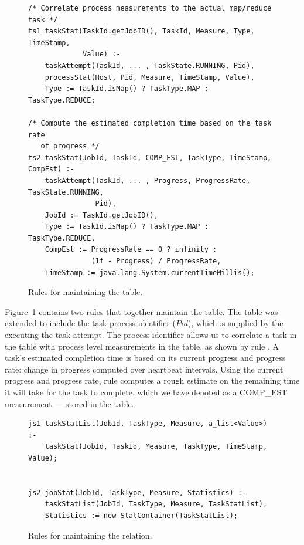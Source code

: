 \begin{figure}
\ssp
\centering
\begin{lstlisting}
/* Correlate process measurements to the actual map/reduce task */
ts1 taskStat(TaskId.getJobID(), TaskId, Measure, Type, TimeStamp, 
             Value) :-
    taskAttempt(TaskId, ... , TaskState.RUNNING, Pid),
    processStat(Host, Pid, Measure, TimeStamp, Value),
    Type := TaskId.isMap() ? TaskType.MAP : TaskType.REDUCE;
        
/* Compute the estimated completion time based on the task rate 
   of progress */
ts2 taskStat(JobId, TaskId, COMP_EST, TaskType, TimeStamp, CompEst) :-
    taskAttempt(TaskId, ... , Progress, ProgressRate, TaskState.RUNNING, 
                Pid),
    JobId := TaskId.getJobID(),
    Type := TaskId.isMap() ? TaskType.MAP : TaskType.REDUCE,
    CompEst := ProgressRate == 0 ? infinity : 
               (1f - Progress) / ProgressRate,
    TimeStamp := java.lang.System.currentTimeMillis();
\end{lstlisting}
\caption{\label{ch:hop:fig:taskstat} Rules for maintaining the  table.}
\end{figure}

Figure~\ref{ch:hop:fig:taskstat} contains two rules that together maintain the
 table.  The  table was extended to include the
task process identifier ($Pid$), which is supplied by the \TT executing the
task attempt.  The process identifier allows us to correlate a task in the
 table with process level measurements in the 
table, as shown by rule .  A task's estimated completion time is based
on its current progress and progress rate: change in progress computed over \TT
heartbeat intervals.  Using the current progress and progress rate, rule
 computes a rough estimate on the remaining time it will take for the
task to complete, which we have denoted as a COMP\_EST measurement --- stored
in the  table.

\begin{figure}
\ssp
\centering
\begin{lstlisting}
js1 taskStatList(JobId, TaskType, Measure, a_list<Value>) :-
    taskStat(JobId, TaskId, Measure, TaskType, TimeStamp, Value);

        
js2 jobStat(JobId, TaskType, Measure, Statistics) :-
    taskStatList(JobId, TaskType, Measure, TaskStatList),
    Statistics := new StatContainer(TaskStatList);
\end{lstlisting}
\caption{\label{ch:hop:fig:jobstat} Rules for maintaining the  relation.}
\end{figure}

